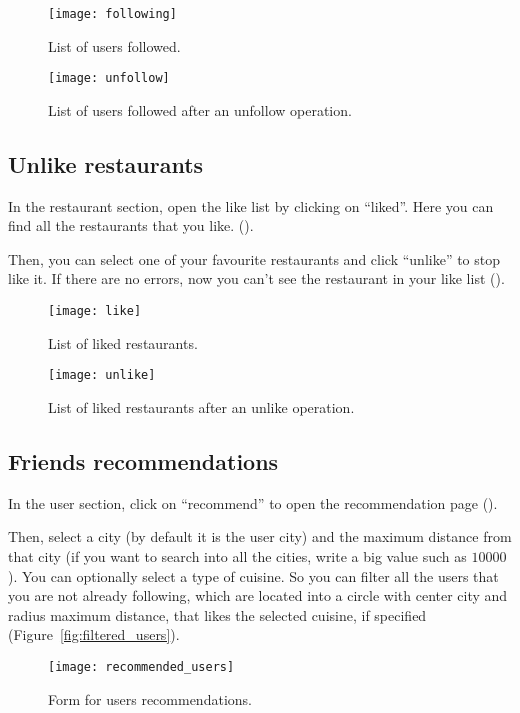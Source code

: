 \begin{figure}[H]
	\texttt{[image: following]}
	\caption{List of users followed.}\label{fig:following}
\end{figure}

\begin{figure}[H]
	\texttt{[image: unfollow]}
	\caption{List of users followed after an unfollow operation.}\label{fig:unfollow}
\end{figure}

\subsection{Unlike restaurants}

In the restaurant section, open the like list by clicking on ``liked''. Here you
can find all the restaurants that you like. ().

Then, you can select one of your favourite restaurants and click ``unlike'' to
stop like it. If there are no errors, now you can't see the restaurant in your
like list ().

\begin{figure}[H]
	\texttt{[image: like]}
	\caption{List of liked restaurants.}\label{fig:like}
\end{figure}

\begin{figure}[H]
	\texttt{[image: unlike]}
	\caption{List of liked restaurants after an unlike operation.}\label{fig:unlike}
\end{figure}

\subsection{Friends recommendations}

In the user section, click on ``recommend'' to open the recommendation page
().

Then, select a city (by default it is the user city) and the maximum distance
from that city (if you want to search into all the cities, write a big value
such as \(10000\)). You can optionally select a type of cuisine. So you can
filter all the users that you are not already following, which are located into
a circle with center city and radius maximum distance, that likes the selected
cuisine, if specified (Figure~\ref{fig:filtered_users}).

\begin{figure}[H]
	\texttt{[image: recommended\_users]}
	\caption{Form for users recommendations.}\label{fig:recommended_users}
\end{figure}

